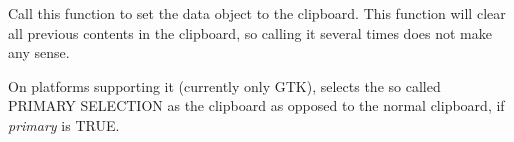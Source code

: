 
Call this function to set the data object to the clipboard. This function will
clear all previous contents in the clipboard, so calling it several times
does not make any sense.

\label{wxclipboarduseprimary}


On platforms supporting it (currently only GTK), selects the so called
PRIMARY SELECTION as the clipboard as opposed to the normal clipboard,
if {\it primary} is TRUE.


